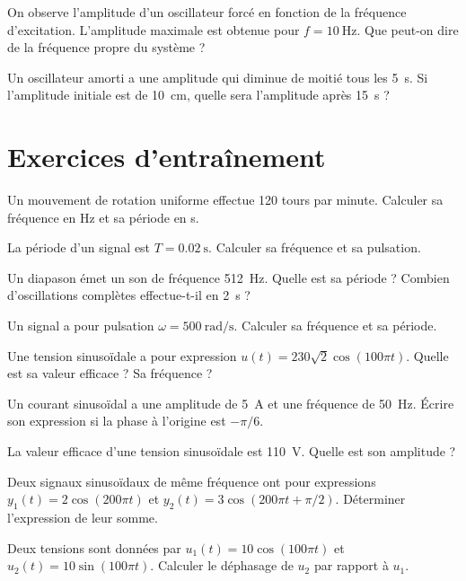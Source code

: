 \exo{} On observe l'amplitude d'un oscillateur forcé en fonction de la fréquence d'excitation. L'amplitude maximale est obtenue pour $f = \SI{10}{\hertz}$. Que peut-on dire de la fréquence propre du système ?

\exo{} Un oscillateur amorti a une amplitude qui diminue de moitié tous les \SI{5}{\second}. Si l'amplitude initiale est de \SI{10}{\centi\metre}, quelle sera l'amplitude après \SI{15}{\second} ?

\section{Exercices d'entraînement}


\exo{} Un mouvement de rotation uniforme effectue 120 tours par minute. Calculer sa fréquence en \si{\hertz} et sa période en \si{\second}.

\exo{} La période d'un signal est $T = \SI{0.02}{\second}$. Calculer sa fréquence et sa pulsation.

\exo{} Un diapason émet un son de fréquence \SI{512}{\hertz}. Quelle est sa période ? Combien d'oscillations complètes effectue-t-il en \SI{2}{\second} ?

\exo{} Un signal a pour pulsation $\omega = \SI{500}{\radian\per\second}$. Calculer sa fréquence et sa période.


\exo{} Une tension sinusoïdale a pour expression $u(t) = 230\sqrt{2}\cos(100\pi t)$. Quelle est sa valeur efficace ? Sa fréquence ?

\exo{} Un courant sinusoïdal a une amplitude de \SI{5}{\ampere} et une fréquence de \SI{50}{\hertz}. Écrire son expression si la phase à l'origine est $-\pi/6$.

\exo{} La valeur efficace d'une tension sinusoïdale est \SI{110}{\volt}. Quelle est son amplitude ?

\exo{} Deux signaux sinusoïdaux de même fréquence ont pour expressions $y_1(t) = 2\cos(200\pi t)$ et $y_2(t) = 3\cos(200\pi t + \pi/2)$. Déterminer l'expression de leur somme.


\exo{} Deux tensions sont données par $u_1(t) = 10\cos(100\pi t)$ et $u_2(t) = 10\sin(100\pi t)$. Calculer le déphasage de $u_2$ par rapport à $u_1$.

